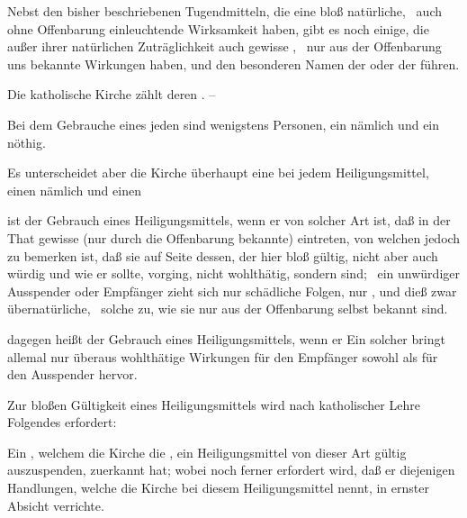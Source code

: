 \begin{aufza}
\item Nebst den bisher beschriebenen Tugendmitteln, die eine bloß natürliche, \dh\  auch ohne Offenbarung einleuchtende Wirksamkeit haben, gibt es noch einige, die außer ihrer natürlichen Zuträglichkeit auch gewisse , \dh\  nur aus der Offenbarung uns bekannte Wirkungen haben, und den besonderen Namen der  oder der  führen.
\item Die katholische Kirche zählt deren . --
\item Bei dem Gebrauche eines jeden sind wenigstens  Personen, ein  nämlich und ein  nöthig.
\item Es unterscheidet aber die Kirche überhaupt eine  bei jedem Heiligungsmittel, einen nämlich und einen ~
\begin{aufzb}
\item {} ist der Gebrauch eines Heiligungsmittels, wenn er von solcher Art ist, daß in der That gewisse  (nur durch die Offenbarung bekannte)  eintreten, von welchen jedoch zu bemerken ist, daß sie auf Seite dessen, der hier bloß gültig, nicht aber auch würdig und wie er sollte, vorging, nicht wohlthätig, sondern  sind; \dh\  ein unwürdiger Ausspender oder Empfänger zieht sich nur schädliche Folgen, nur , und dieß zwar übernatürliche, \dh\  solche zu, wie sie nur aus der Offenbarung selbst bekannt sind.
\item {} dagegen heißt der Gebrauch eines Heiligungsmittels, wenn er  Ein solcher bringt allemal nur überaus wohlthätige Wirkungen für den Empfänger sowohl als für den Ausspender hervor.
\end{aufzb}
\item Zur bloßen Gültigkeit eines Heiligungsmittels wird nach katholischer Lehre Folgendes erfordert:
\begin{aufzb}
\item Ein , welchem die Kirche die , ein Heiligungsmittel von dieser Art gültig auszuspenden, zuerkannt hat; wobei noch ferner erfordert wird, daß er diejenigen Handlungen, welche die Kirche bei diesem Heiligungsmittel  nennt, in ernster Absicht verrichte.

\end{aufzb}
\end{aufza}
